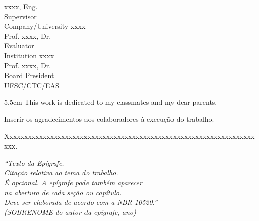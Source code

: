 \begin{folhadeaprovacao}
	\vspace*{2\baselineskip}
	xxxx, Eng.\\
	Supervisor \\
	Company/University xxxx\\
	
	\vspace*{2\baselineskip}
	Prof. xxxx, Dr.\\
	Evaluator \\
	Institution xxxx\\
	
	\vspace*{2\baselineskip}
	Prof. xxxx, Dr.\\
	Board President \\
	UFSC/CTC/EAS
\end{folhadeaprovacao}

\begin{dedicatoria}
	\vspace*{\fill}
	\noindent
	\begin{adjustwidth*}{}{5.5cm} 
		\raggedleft       
		This work is dedicated to my classmates and my dear parents.
	\end{adjustwidth*}
\end{dedicatoria}

\begin{agradecimentos}
	Inserir os agradecimentos aos colaboradores à execução do trabalho. 
	
	Xxxxxxxxxxxxxxxxxxxxxxxxxxxxxxxxxxxxxxxxxxxxxxxxxxxxxxxxxxxxxxxxxxxxxx. 
\end{agradecimentos}

\begin{epigrafe}
	\vspace*{\fill}
	\begin{flushright}
		\textit{``Texto da Epígrafe.\\
			Citação relativa ao tema do trabalho.\\
			É opcional. A epígrafe pode também aparecer\\
			na abertura de cada seção ou capítulo.\\
			Deve ser elaborada de acordo com a NBR 10520.''\\
			(SOBRENOME do autor da epígrafe, ano)}
	\end{flushright}
\end{epigrafe}

